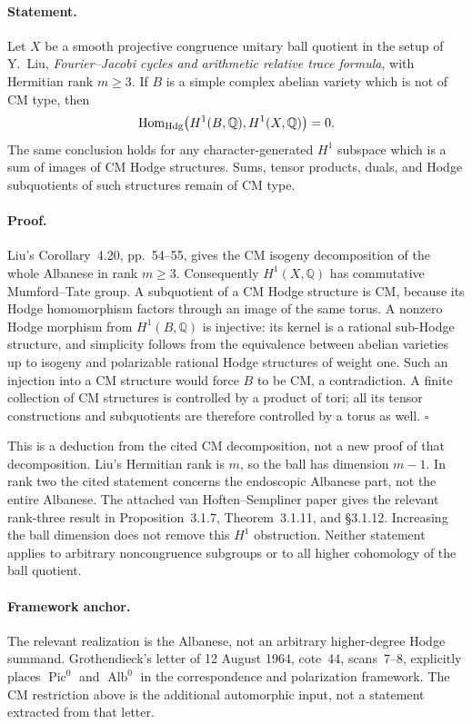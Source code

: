 \documentclass[11pt]{article}
\newcommand{\Q}{\mathbb Q}\newcommand{\C}{\mathbb C}\newcommand{\Z}{\mathbb Z}\newcommand{\R}{\mathbb R}\newcommand{\A}{\mathbb A}\newcommand{\OO}{\mathcal O}
\theoremstyle{definition}\newtheorem{definition}[theorem]{Definition}\newtheorem{remark}[theorem]{Remark}
\begin{document}
\paragraph{Statement.}
Let $X$ be a smooth projective congruence unitary ball quotient in the
setup of Y.~Liu, \emph{Fourier--Jacobi cycles and arithmetic relative
trace formula}, with Hermitian rank $m\geq3$. If $B$ is a simple complex
abelian variety which is not of CM type, then
\[
 \Hom_{\mathrm{Hdg}}\bigl(H^1(B,\Q),H^1(X,\Q)\bigr)=0.
\]
The same conclusion holds for any character-generated $H^1$ subspace
which is a sum of images of CM Hodge structures. Sums, tensor products,
duals, and Hodge subquotients of such structures remain of CM type.

\paragraph{Proof.}
Liu's Corollary~4.20, pp.~54--55, gives the CM isogeny decomposition of
the whole Albanese in rank $m\geq3$. Consequently $H^1(X,\Q)$ has
commutative Mumford--Tate group. A subquotient of a CM Hodge structure
is CM, because its Hodge homomorphism factors through an image of the
same torus. A nonzero Hodge morphism from $H^1(B,\Q)$ is injective:
its kernel is a rational sub-Hodge structure, and simplicity follows
from the equivalence between abelian varieties up to isogeny and
polarizable rational Hodge structures of weight one. Such an
injection into a CM structure would force $B$ to be CM, a
contradiction. A finite collection of CM structures is controlled by
a product of tori; all its tensor constructions and subquotients are
therefore controlled by a torus as well. $\square$

This is a deduction from the cited CM decomposition, not a new proof
of that decomposition. Liu's Hermitian rank is $m$, so the ball has
dimension $m-1$. In rank two the cited statement concerns the
endoscopic Albanese part, not the entire Albanese. The attached
van Hoften--Sempliner paper gives the relevant rank-three result in
Proposition~3.1.7, Theorem~3.1.11, and \S3.1.12. Increasing the ball
dimension does not remove this $H^1$ obstruction. Neither statement
applies to arbitrary noncongruence subgroups or to all higher
cohomology of the ball quotient.

\paragraph{Framework anchor.}
The relevant realization is the Albanese, not an arbitrary higher-degree
Hodge summand.  Grothendieck's letter of 12 August 1964, cote~44,
scans~7--8, explicitly places $\operatorname{Pic}^0$ and
$\operatorname{Alb}^0$ in the correspondence and polarization framework.
The CM restriction above is the additional automorphic input, not a
statement extracted from that letter.
\end{document}
